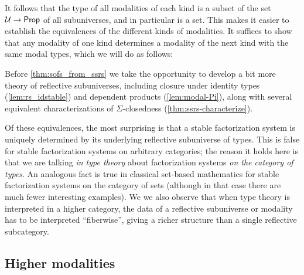 It follows that the type of all modalities of each
kind is a subset of the set $\mathcal{U}\to\mathsf{Prop}$ of all subuniverses, and in particular is a set.
This makes it easier to establish
the equivalences of the different kinds of modalities.
It suffices
to show that any modality of one kind determines a modality of the next kind
with the same modal types, which we will do as follows:
\begin{center}
\end{center}
Before \autoref{thm:sofs_from_ssrs} we take the opportunity to develop a bit more theory of reflective subuniverses, including closure under identity types (\autoref{lem:rs_idstable}) and dependent products
(\autoref{lem:modal-Pi}), along with several equivalent characterizations of $\Sigma$-closedness (\autoref{thm:ssrs-characterize}).

Of these equivalences, the most surprising is that a stable factorization system is uniquely determined by its underlying reflective subuniverse of types.
This is false for stable factorization systems on arbitrary categories; the reason it holds here is that we are talking \emph{in type theory} about factorization systems \emph{on the category of types}.
An analogous fact is true in classical set-based mathematics for stable factorization systems on the category of sets (although in that case there are much fewer interesting examples).
We \cite{RijkeShulmanSpitters} we also observe that when type theory is interpreted in a higher category, the data of a reflective subuniverse or modality has to be interpreted ``fiberwise'', giving a richer structure than a single reflective subcategory.


\subsection{Higher modalities}
\label{sec:higher-modalities}

